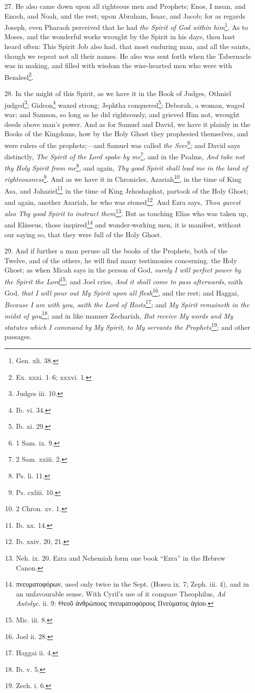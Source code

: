 27. He also came down upon all righteous men and Prophets; Enos, I mean, and Enoch, and Noah, and the rest; upon Abraham, Isaac, and Jacob; for as regards Joseph, even Pharaoh perceived that he had \emph{the Spirit of God within him}\footnote{Gen. xli. 38.}. As to Moses, and the wonderful works wrought by the Spirit in his days, thou hast heard often: This Spirit Job also had, that most enduring man, and all the saints, though we repeat not all their names. He also was sent forth when the Tabernacle was in making, and filled with wisdom the wise-hearted men who were with Bezaleel\footnote{Ex. xxxi. 1–6; xxxvi. 1.}.

28. In the might of this Spirit, as we have it in the Book of Judges, Othniel judged\footnote{Judges iii. 10.}; Gideon\footnote{Ib. vi. 34.} waxed strong; Jephtha conquered\footnote{Ib. xi. 29.}; Deborah, a woman, waged war; and Samson, so long as he did righteously, and grieved Him not, wrought deeds above man’s power. And as for Samuel and David, we have it plainly in the Books of the Kingdoms, how by the Holy Ghost they prophesied themselves, and were rulers of the prophets;—and Samuel was called \emph{the Seer}\footnote{1 Sam. ix. 9.}; and David says distinctly, \emph{The Spirit of the Lord spake by me}\footnote{2 Sam. xxiii. 2.}, and in the Psalms, \emph{And take not thy Holy Spirit from me}\footnote{Ps. li. 11.}, and again, \emph{Thy good Spirit shall lead me in the land of righteousness}\footnote{Ps. cxliii. 10.}. And as we have it in Chronicles, Azariah\footnote{2 Chron. xv. 1.}, in the time of King Asa, and Jahaziel\footnote{Ib. xx. 14.} in the time of King Jehoshaphat, partook of the Holy Ghost; and again, another Azariah, he who was stoned\footnote{Ib. xxiv. 20, 21.}. And Ezra says, \emph{Thou gavest also Thy good Spirit to instruct them}\footnote{Neh. ix. 20. Ezra and Nehemiah form one book “Ezra” in the Hebrew Canon.}. But as touching Elias who was taken up, and Elisseus, those inspired\footnote{\textgreek{πνευματοφόρων}, used only twice in the Sept. (Hosea ix. 7; Zeph. iii. 4), and in an unfavourable sense. With Cyril’s use of it compare Theophilus, \emph{Ad Autolyc}. ii. 9: \textgreek{Θεοῦ ἀνθρώπους πνευματοφόρους Πνεύματος ἁγίου}.} and wonder-working men, it is manifest, without our saying so, that they were full of the Holy Ghost.

29. And if further a man peruse all the books of the Prophets, both of the Twelve, and of the others, he will find many testimonies concerning. the Holy Ghost; as when Micah says in the person of God, \emph{surely I will perfect power by the Spirit the Lord}\footnote{Mic. iii. 8.}; and Joel cries, \emph{And it shall come to pass afterwards}, saith God, \emph{that I will pour out My Spirit upon all flesh}\footnote{Joel ii. 28.}, and the rest; and Haggai, \emph{Because I am with you, saith the Lord of Hosts}\footnote{Haggai ii. 4.}; and \emph{My Spirit remaineth in the midst of you}\footnote{Ib. v. 5.}; and in like manner Zechariah, \emph{But receive My words and My statutes which I command by My Spirit, to My servants the Prophets}\footnote{Zech. i. 6.}; and other passages.

